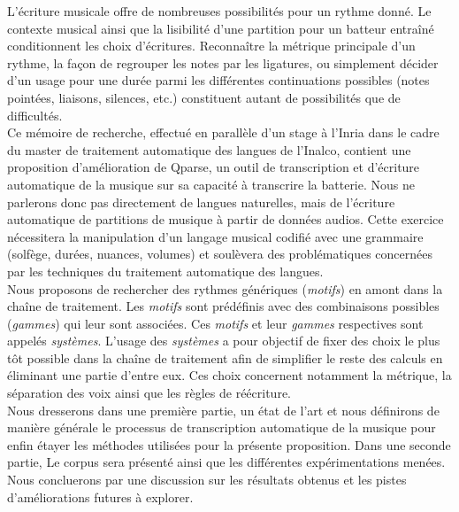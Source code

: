 L’écriture musicale offre de nombreuses possibilités pour un rythme donné. Le contexte musical ainsi que la lisibilité d’une partition pour un batteur entraîné conditionnent les choix d’écritures. Reconnaître la métrique principale d’un rythme, la façon de regrouper les notes par les ligatures, ou simplement décider d’un usage pour une durée parmi les différentes continuations possibles (notes pointées, liaisons, silences, etc.) constituent autant de possibilités que de difficultés.\\Ce mémoire de recherche, effectué en parallèle d’un stage à l’Inria dans le cadre du master de traitement automatique des langues de l’Inalco, contient une proposition d’amélioration de Qparse, un outil de transcription et d’écriture automatique de la musique sur sa capacité à transcrire la batterie. Nous ne parlerons donc pas directement de langues naturelles, mais de l’écriture automatique de partitions de musique à partir de données audios. Cette exercice nécessitera la manipulation d’un langage musical codifié avec une grammaire (solfège, durées, nuances, volumes) et soulèvera des problématiques concernées par les techniques du traitement automatique des langues.\\
Nous proposons de rechercher des rythmes génériques (\textit{motifs}) en amont dans la chaîne de traitement. Les \textit{motifs} sont prédéfinis avec des combinaisons possibles (\textit{gammes}) qui leur sont associées. Ces \textit{motifs} et leur \textit{gammes} respectives sont appelés \textit{systèmes}. L’usage des \textit{systèmes} a pour objectif de fixer des choix le plus tôt possible dans la chaîne de traitement afin de simplifier le reste des calculs en éliminant une partie d’entre eux. Ces choix concernent notamment la métrique, la séparation des voix ainsi que les règles de réécriture.\\
Nous dresserons dans une première partie, un état de l’art et nous définirons de manière générale le processus de transcription automatique de la musique pour enfin étayer les méthodes utilisées pour la présente proposition. Dans une seconde partie, Le corpus sera présenté ainsi que les différentes expérimentations menées. Nous concluerons par une discussion sur les résultats obtenus et les pistes d’améliorations futures à explorer.